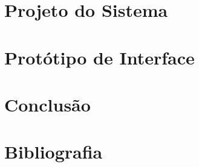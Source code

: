 \documentclass[a4paper, 12pt]{article}
\begin{document}
\section{Projeto do Sistema}

\newpage
\section{Protótipo de Interface}

\newpage
\section{Conclusão}

\newpage
\section{Bibliografia}
\end{document}

